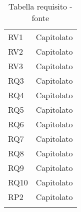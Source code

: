 {\begin{longtable}{C{.47\freewidth} C{.47\freewidth}}
      RV1 & Capitolato\\
      RV2 & Capitolato\\
      RV3 & Capitolato\\

      RQ3 & Capitolato\\
      RQ4 & Capitolato\\
      RQ5 & Capitolato\\
      RQ6 & Capitolato\\
      RQ7 & Capitolato\\
      RQ8 & Capitolato\\
      RQ9 & Capitolato\\
      RQ10 & Capitolato\\

      RP2 & Capitolato\\
      \bottomrule
      \caption{Tabella requisito - fonte}
      \end{longtable}
}
